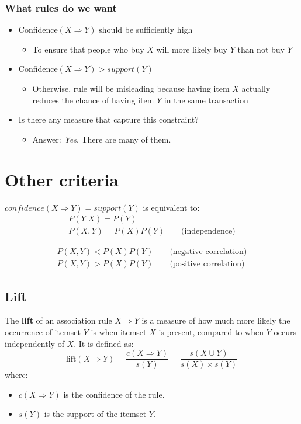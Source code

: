 \subsubsection{What rules do we want}
\begin{itemize}
	\item Confidence$(X \Rightarrow Y)$ should be sufficiently high
	\begin{itemize}
		\item To ensure that people who buy $X$ will more likely buy $Y$ than not buy $Y$
	\end{itemize}
	\item Confidence$(X \Rightarrow Y) > support(Y)$
	\begin{itemize}
		\item Otherwise, rule will be misleading because having item $X$ actually reduces the chance of having item $Y$ in the same transaction
	\end{itemize}
	\item Is there any measure that capture this constraint?
	\begin{itemize}
		\item Answer: \textit{Yes}. There are many of them.
	\end{itemize}
\end{itemize}

\section{Other criteria}
$ \textit{confidence}(X \Rightarrow Y) = support(Y)$ is equivalent to:
\begin{align*}
   P(Y|X) = P(Y)\\
   P(X,Y) = P(X)P(Y) \qquad \text{(independence)}
\end{align*}

\begin{align*}
   P(X,Y) < P(X)P(Y) \qquad \text{(negative correlation)}\\
   P(X,Y) > P(X)P(Y) \qquad \text{(positive correlation)}
\end{align*}


\subsection{Lift}
The \textbf{lift} of an association rule $X \Rightarrow Y$ is a measure of how much more likely the occurrence of itemset $Y$ is when itemset $X$ is present, compared to when $Y$ occurs independently of $X$. It is defined as:
\[\text{lift}(X \Rightarrow Y) = \frac{c(X \Rightarrow Y)}{s(Y)} = \frac{s(X \cup Y)}{s(X) \times s(Y)}\]
where:
\begin{itemize}
   \item $c(X \Rightarrow Y)$ is the confidence of the rule.
   \item $s(Y)$ is the support of the itemset $Y$.
\end{itemize}

